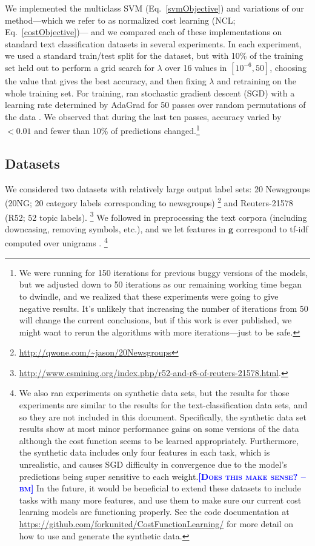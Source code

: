 \documentclass{article} %
\newcommand{\ourmethod}{NCL}
\newcommand{\bmcomment}[1]{\textcolor{blue}{\textsc{\textbf{[#1 --bm]}}}}
\begin{document}
We implemented the multiclass SVM (Eq.~\ref{svmObjective}) and
variations of our method---which we refer to as
normalized cost learning (\ourmethod{}; Eq.~\ref{costObjective})---
and we compared each of these implementations on standard text
classification datasets in several experiments.  In each experiment, 
we used a standard train/test split for the dataset, but with 10\% of
the training set held out to perform a grid search for $\lambda$ over
16 values in $[10^{-6}, 50]$, choosing the value that
gives the best accuracy, and then fixing $\lambda$ and
retraining on the whole training set.  For training,
ran 
stochastic gradient descent (SGD) with a learning rate determined
by AdaGrad for 50 passes over random permutations of the data
\citep{yin2003stochastic}\citep{duchi2011adaptive}.  We observed that 
during the last ten
passes, accuracy varied by $<
0.01$ and fewer than 10\% of predictions changed.\footnote{
We were running for 150 iterations for previous buggy
versions of the models, but we adjusted down to 50 iterations 
as our remaining working time began to dwindle, and we realized 
that these experiments were going to give negative results.  It's
 unlikely that increasing the number of iterations from 50 will
change the current conclusions, but if this work is ever published,
we might want to rerun the algorithms with more iterations---just 
to be safe.
}

\subsection{Datasets}

We considered two datasets with relatively large output label sets:
20 Newsgroups (20NG; 20 category labels corresponding to newsgroups)
\footnote{\url{http://qwone.com/~jason/20Newsgroups}} and Reuters-21578
(R52; 52 topic labels).
\footnote{\url{http://www.csmining.org/index.php/r52-and-r8-of-reuters-21578.html}.}    
We followed \citep{2007:phd-Ana-Cardoso-Cachopo} in
preprocessing the text corpora (including downcasing, removing
symbols, etc.), and we let features in $\mathbf{g}$ correspond to tf-idf 
computed over unigrams \citep{lan2006proposing}.
\footnote{We also ran experiments
on synthetic data sets, but the results for those experiments are similar
to the results for the text-classification data sets, and 
so they are not included in this document. Specifically, the synthetic data
set results show at most minor performance gains on some versions of the data
although the cost function seems to be learned appropriately.
Furthermore, the synthetic data includes only four features in each task,
which is unrealistic, and causes SGD difficulty in convergence
due to the model's predictions being super sensitive to 
each weight.\bmcomment{Does this make sense?}  In the 
future, it would be 
beneficial
to extend these datasets to include tasks with many more
features,
and use them to make sure our current cost learning models 
are 
functioning properly.
 See the code documentation
at \url{https://github.com/forkunited/CostFunctionLearning/} for more 
detail on how to use and generate the synthetic data.}
\end{document}
